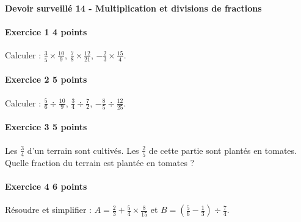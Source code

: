 \documentclass[a4paper,10pt]{article}
\newenvironment{exercice}[2]{\paragraph{Exercice #1 \hfill #2 points}\mbox{}\par}{\medskip}
\begin{document}
\begin{center}\Large\bfseries Devoir surveillé 14 - Multiplication et divisions de fractions\end{center}
\vspace{2mm}
\begin{exercice}{1}{4}Calculer : $\frac35\times\frac{10}{9}$, $\frac78\times\frac{12}{21}$, $-\frac23\times\frac{15}{4}$.\end{exercice}\begin{exercice}{2}{5}Calculer : $\frac56\div\frac{10}{9}$, $\frac34\div\frac{7}{2}$, $-\frac85\div\frac{12}{25}$.\end{exercice}\begin{exercice}{3}{5}Les $\frac34$ d'un terrain sont cultivés. Les $\frac25$ de cette partie sont plantés en tomates. Quelle fraction du terrain est plantée en tomates ?\end{exercice}\begin{exercice}{4}{6}Résoudre et simplifier : $A=\frac23+\frac54\times\frac{8}{15}$ et $B=(\frac56-\frac13)\div\frac74$.\end{exercice}
\end{document}
